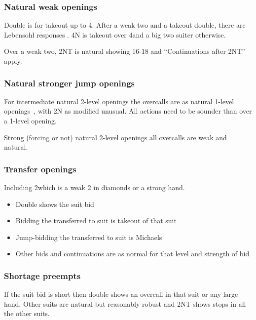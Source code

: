\documentclass[a4paper,14pt]{extarticle}
\begin{document}
\subsubsection{Natural weak openings}
\label{sec:def:weak}

Double is for takeout up to 4\hearts. After a weak two and a takeout double, there
are Lebensohl responses . 4N is takeout over 4\spades and a big two suiter otherwise.

Over a weak two,  2NT is natural showing 16-18 and ``Continuations after 2NT'' 
apply.

\subsubsection{Natural stronger jump openings}
\label{sec:def:inter-strong}

For intermediate natural 2-level openings the overcalls are as natural 1-level
openings~, with 2N as modified unusual. All actions need to be
sounder than over a 1-level opening.

Strong (forcing or not) natural 2-level openings all overcalls are weak and natural.

\subsubsection{Transfer openings}
\label{sec:def:transfer}

Including 2\clubs which is a weak 2 in diamonds or a strong hand.

\begin{itemize}
\item Double shows the suit bid
\item Bidding the transferred to suit is takeout of that suit
\item Jump-bidding the transferred to suit is Michaels
\item Other bids and continuations are as normal for that level and strength of bid
\end{itemize}

\subsubsection{Shortage preempts}

If the suit bid is short then double shows an overcall in that suit or any
large hand.  Other suits are natural but reasonably robust and 2NT shows stops
in all the other suits.
\end{document}
